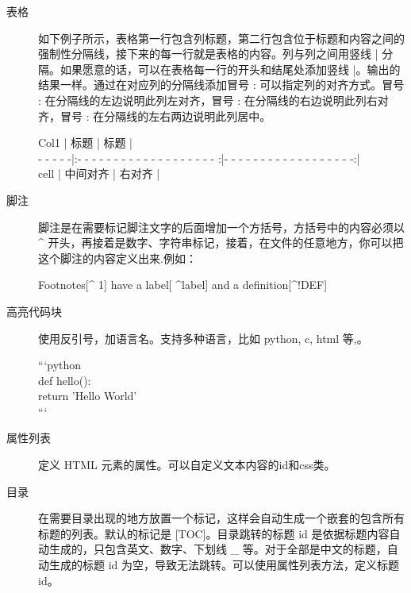 \begin{description}
\item[表格] 如下例子所示，表格第一行包含列标题，第二行包含位于标题和内容之间的强制性分隔线，接下来的每一行就是表格的内容。列与列之间用竖线 | 分隔。如果愿意的话，可以在表格每一行的开头和结尾处添加竖线 |。输出的结果一样。通过在对应列的分隔线添加冒号 : 可以指定列的对齐方式。冒号 : 在分隔线的左边说明此列左对齐，冒号 : 在分隔线的右边说明此列右对齐，冒号 : 在分隔线的左右两边说明此列居中。
  \begin{bframe}
    Col1     |                  标题                   |               标题                  |\\
    - - - - -|:- - - - - - - - - - - - - - - - - - - :|- - - - - - - - - - - - - - - - - -:|\\
    cell     |                中间对齐                 |              右对齐                 |\\
  \end{bframe}
\item[脚注] 脚注是在需要标记脚注文字的后面增加一个方括号，方括号中的内容必须以  \^{} 开头，再接着是数字、字符串标记，接着，在文件的任意地方，你可以把这个脚注的内容定义出来.例如：
  \begin{bframe}
    Footnotes[\^{} 1] have a label[ \^{}label] and a definition[\^{}!DEF]\\
  \end{bframe}
\item[高亮代码块] 使用反引号，加语言名。支持多种语言，比如 python, c, html 等,。
  \begin{bframe}
    ```python\\
   def hello():\\
    return 'Hello World'\\
    ```\\
  \end{bframe}
\item[属性列表] 定义 HTML 元素的属性。可以自定义文本内容的id和css类。
\item[目录] 在需要目录出现的地方放置一个标记，这样会自动生成一个嵌套的包含所有标题的列表。默认的标记是 [TOC]。目录跳转的标题 id 是依据标题内容自动生成的，只包含英文、数字、下划线 \_ 等。对于全部是中文的标题，自动生成的标题 id 为空，导致无法跳转。可以使用属性列表方法，定义标题 id。
\end{description}
